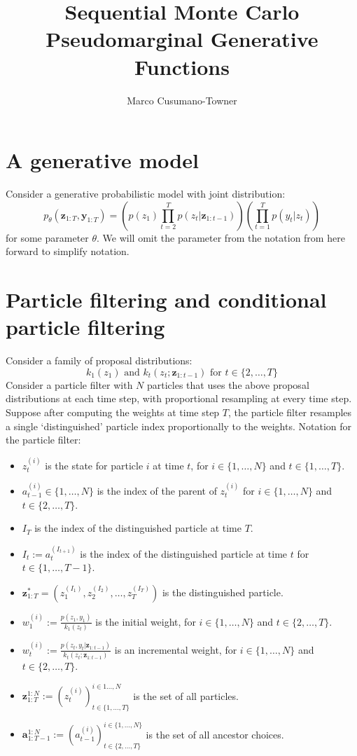 \documentclass[11pt]{article}
\title{Sequential Monte Carlo Pseudomarginal Generative Functions}
\author{Marco Cusumano-Towner}
\newcommand{\z}{\mathbf{z}}
\newcommand{\abold}{\mathbf{a}}
\newcommand{\y}{\mathbf{y}}
\begin{document}
\maketitle

\section{A generative model}
\noindent Consider a generative probabilistic model with joint distribution:
\[
p_{\theta}(\z_{1:T}, \y_{1:T}) = \left( p(z_1) \prod_{t=2}^T p(z_t | \z_{1:t-1})  \right) \left( \prod_{t=1}^T p(y_t | z_t) \right)
\]
for some parameter $\theta$.
We will omit the parameter from the notation from here forward to simplify notation.

\section{Particle filtering and conditional particle filtering}
Consider a family of proposal distributions:
\[
    k_1(z_1) \mbox{ and } k_t(z_t; \z_{1:t-1}) \mbox{ for } t \in \{2, \ldots, T\}
\]
Consider a particle filter with $N$ particles that uses the above proposal distributions at each time step, with proportional resampling at every time step.
Suppose after computing the weights at time step $T$, the particle filter resamples a single `distinguished' particle index proportionally to the weights.
Notation for the particle filter:
\begin{itemize}
    \item $z_t^{(i)}$ is the state for particle $i$ at time $t$, for $i \in \{1, \ldots, N\}$ and $t \in \{1, \ldots, T\}$.
    \item $a_{t-1}^{(i)} \in \{1, \ldots, N\}$ is the index of the parent of $z_t^{(i)}$ for $i \in \{1, \ldots, N\}$ and $t \in \{2, \ldots, T\}$.
    \item $I_T$ is the index of the distinguished particle at time $T$.
    \item $I_t := a_t^{(I_{t+1})}$ is the index of the distinguished particle at time $t$ for $t \in \{1, \ldots, T-1\}$.
    \item $\z_{1:T}^* = (z_1^{(I_1)}, z_2^{(I_2)}, \ldots, z_T^{(I_T)})$ is the distinguished particle.
    \item $w^{(i)}_1 := \displaystyle \frac{p(z_1, y_1)}{k_1(z_t)}$ is the initial weight, for $i \in \{1, \ldots, N\}$ and $t \in \{2, \ldots, T\}$.
    \item $w^{(i)}_t := \displaystyle \frac{p(z_t, y_t | \z_{1:t-1})}{k_t(z_t; \z_{1:t-1})}$ is an incremental weight, for $i \in \{1, \ldots, N\}$ and $t \in \{2, \ldots, T\}$.
    \item $\z_{1:T}^{1:N} := (z_t^{(i)})_{t \in \{1, \ldots, T\}}^{i \in 1 \ldots, N}$ is the set of all particles.
    \item $\abold_{1:T-1}^{1:N} := (a^{(i)}_{t-1})_{t \in \{2, \ldots, T\}}^{i \in \{1, \ldots, N\}}$ is the set of all ancestor choices.
\end{itemize}
\end{document}
